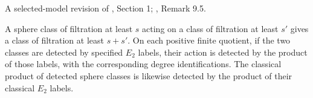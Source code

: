 \begin{proposition}
\label{sem:Literature:filtered-product-detection}
A selected-model revision of \cite{Moss}, Section 1; \cite{BHS}, Remark 9.5.\par

A sphere class of filtration at least $s$ acting on a class of filtration at least $s'$ gives a class of filtration at least $s+s'$. On each positive finite quotient, if the two classes are detected by specified $E_2$ labels, their action is detected by the product of those labels, with the corresponding degree identifications. The classical product of detected sphere classes is likewise detected by the product of their classical $E_2$ labels.
\end{proposition}


